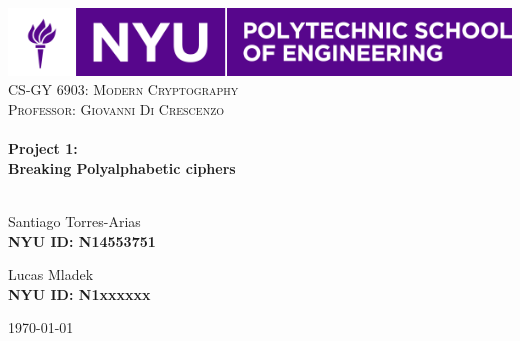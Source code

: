 \begin{titlepage}

\begin{center}


\includegraphics[width=.5\textwidth]{./logo}\\[1cm]    

\textsc{\LARGE CS-GY 6903: Modern Cryptography}\\[1.5cm]

\textsc{\Large Professor: Giovanni Di Crescenzo}\\[0.5cm]

\HRule \\[0.4cm]
{ \large \bfseries Project 1:\\
{\small Breaking Polyalphabetic ciphers}}\\[0.4cm]

\HRule \\[1.5cm]
\begin{minipage}{0.4\textwidth}
\begin{flushleft}
\large Santiago Torres-Arias\\
{\small {\bf NYU ID: N14553751 } }
\end{flushleft}
\end{minipage}
\begin{minipage}{0.40\textwidth}
\begin{flushright}
\large Lucas Mladek\\
{\small {\bf NYU ID: N1xxxxxx } } 
\end{flushright}
\end{minipage} 

\vfill

{\large \today}

\end{center}
\end{titlepage}
